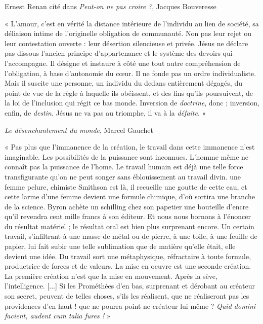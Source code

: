 \documentclass{article}
\begin{document}
\begin{flushright}Ernest Renan cité dans \textit{Peut-on ne pas croire ?}, Jacques Bouveresse\end{flushright}
\vspace{8pt}
\begin{center} « L'amour, c'est en vérité la distance intérieure de l'individu au lien de société, sa déliaison intime de l'originelle obligation de communauté. Non pas leur rejet ou leur contestation ouverte : leur désertion silencieuse et privée. Jésus ne déclare pas dissous l'ancien principe d'appartenance et le système des devoirs qui l'accompagne. Il désigne et instaure à côté une tout autre compréhension de l'obligation, à base d'autonomie du cœur. Il ne fonde pas un ordre individualiste. Mais il suscite une personne, un individu du dedans entièrement dégagés, du point de vue de la règle à laquelle ils obéissent, et des fins qu'ils poursuivent, de la loi de l'inclusion qui régit ce bas monde.
Inversion de \textit{doctrine}, donc ; inversion, enfin, de \textit{destin}. Jésus ne va pas au triomphe, il va à la \textit{défaite}. »\end{center}

\begin{flushright}\textit{Le désenchantement du monde}, Marcel Gauchet\end{flushright}
\vspace{8pt}
\begin{center} « Pas plus que l'immanence de la création, le travail dans cette immanence n'est imaginable. Les possibilités de la puissance sont inconnues. L'homme même ne connaît pas la puissance de l'home. Le travail humain est déjà une telle force transfigurante qu'on ne peut songer sans éblouissement au travail divin. une femme pelure, chimiste Smithson est là, il recueille une goutte de cette eau, et cette larme d'une femme devient une formule chimique, d'où sortira une branche de la science. Byron achète un schilling chez son papetier une bouteille d'encre qu'il revendra cent mille francs à son éditeur. Et nous nous bornons à l'énoncer du résultat matériel ; le résultat oral est bien plus surprenant encore. Un certain travail, s'infiltrant à une masse de métal ou de pierre, à une toile, à une feuille de papier, lui fait subir une telle sublimation que de matière qu'elle était, elle devient une idée. Du travail sort une métaphysique, réfractaire à toute formule, productrice de forces et de valeurs. La mise en oeuvre est une seconde création. La première création n'est que la mise en mouvement. Après la sève, l'intelligence. [...] Si les Prométhées d'en bas, surprenant et dérobant au créateur son secret, peuvent de telles choses, s'ils les réalisent, que ne réaliseront pas les providences d'en haut ! que ne pourra point ne créateur lui-même ? \textit{Quid domini facient, audent cum talia fures !} »\end{center}
\end{document}
